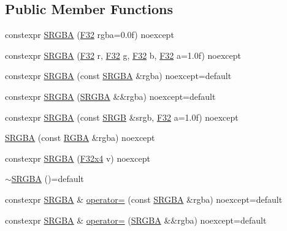 \subsection*{Public Member Functions}
\begin{DoxyCompactItemize}
\item 
constexpr \hyperlink{structmage_1_1_s_r_g_b_a_ab2d736d077534d550020b0f01e5780ae}{S\+R\+G\+BA} (\hyperlink{namespacemage_aa97e833b45f06d60a0a9c4fc22ae02c0}{F32} rgba=0.\+0f) noexcept
\item 
constexpr \hyperlink{structmage_1_1_s_r_g_b_a_a159096e69a7e18eee0d6718d244a1493}{S\+R\+G\+BA} (\hyperlink{namespacemage_aa97e833b45f06d60a0a9c4fc22ae02c0}{F32} r, \hyperlink{namespacemage_aa97e833b45f06d60a0a9c4fc22ae02c0}{F32} g, \hyperlink{namespacemage_aa97e833b45f06d60a0a9c4fc22ae02c0}{F32} b, \hyperlink{namespacemage_aa97e833b45f06d60a0a9c4fc22ae02c0}{F32} a=1.\+0f) noexcept
\item 
constexpr \hyperlink{structmage_1_1_s_r_g_b_a_a2f1125cfd0ba308a1f249e2b43637031}{S\+R\+G\+BA} (const \hyperlink{structmage_1_1_s_r_g_b_a}{S\+R\+G\+BA} \&rgba) noexcept=default
\item 
constexpr \hyperlink{structmage_1_1_s_r_g_b_a_abb441510c3afe709ddfb6f094f1ba2e5}{S\+R\+G\+BA} (\hyperlink{structmage_1_1_s_r_g_b_a}{S\+R\+G\+BA} \&\&rgba) noexcept=default
\item 
constexpr \hyperlink{structmage_1_1_s_r_g_b_a_a5ff3a33ee8ee285bec1735e8c796a766}{S\+R\+G\+BA} (const \hyperlink{structmage_1_1_s_r_g_b}{S\+R\+GB} \&srgb, \hyperlink{namespacemage_aa97e833b45f06d60a0a9c4fc22ae02c0}{F32} a=1.\+0f) noexcept
\item 
\hyperlink{structmage_1_1_s_r_g_b_a_a17b38cf5574d403a22e0bacbfc1c9416}{S\+R\+G\+BA} (const \hyperlink{structmage_1_1_r_g_b_a}{R\+G\+BA} \&rgba) noexcept
\item 
constexpr \hyperlink{structmage_1_1_s_r_g_b_a_a172912ff3393d3ffee54f63135cfee3c}{S\+R\+G\+BA} (\hyperlink{namespacemage_a9b8168505574a087f7391e56522fa584}{F32x4} v) noexcept
\item 
\hyperlink{structmage_1_1_s_r_g_b_a_a1a3df218eb9077b50380b831dbbfc753}{$\sim$\+S\+R\+G\+BA} ()=default
\item 
constexpr \hyperlink{structmage_1_1_s_r_g_b_a}{S\+R\+G\+BA} \& \hyperlink{structmage_1_1_s_r_g_b_a_affa097b1744a66624f40102870909ea9}{operator=} (const \hyperlink{structmage_1_1_s_r_g_b_a}{S\+R\+G\+BA} \&rgba) noexcept=default
\item 
constexpr \hyperlink{structmage_1_1_s_r_g_b_a}{S\+R\+G\+BA} \& \hyperlink{structmage_1_1_s_r_g_b_a_abf4cd2acd424cbad774a5170087f7b01}{operator=} (\hyperlink{structmage_1_1_s_r_g_b_a}{S\+R\+G\+BA} \&\&rgba) noexcept=default
\end{DoxyCompactItemize}


